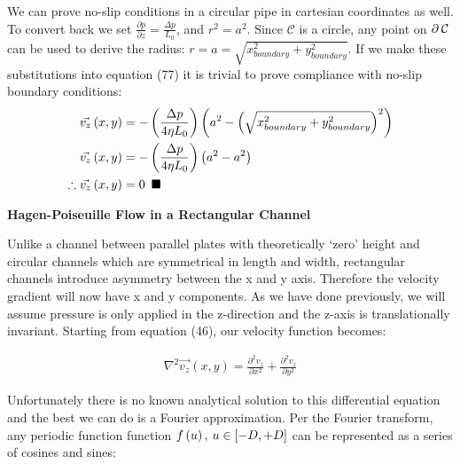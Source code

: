 \documentclass[titlepage]{article}
\begin{document}
    \noindent We can prove no-slip conditions in a circular pipe in  cartesian coordinates as well. To convert back we set $\displaystyle\frac{\partial{p}}{\partial{z}}=\displaystyle\frac{\Delta{p}}{L_{0}}$, and $r^2=a^2$. Since $\mathcal{C}$ is a circle, any point on $\partial\hspace*{2pt}\mathcal{C}$ can be used to derive the radius: 
    $r=a=\sqrt{x_{boundary}^2+y_{boundary}^2}$. If we make these substitutions into equation (77) it is trivial to prove compliance with no-slip boundary conditions:
    \begin{align}
        \vec{v_{z}}\left(x,y\right) &= -\left(\displaystyle\frac{\Delta{p}}{4\eta{L_{0}}}\right)\left(a^2-\left(\sqrt{x_{boundary}^2+y_{boundary}^2}\right)^2\right) \\
        \vec{v_{z}}\left(x,y\right) &= -\left(\displaystyle\frac{\Delta{p}}{4\eta{L_{0}}}\right)\left(a^2-a^2\right) \\
        \therefore \vec{v_{z}}\left(x,y\right) &= 0 \hspace*{5pt}\blacksquare
    \end{align}

    \newpage
    \begin{center}
        \large
        \textbf{Hagen-Poiseuille Flow in a Rectangular Channel} \\
    \end{center}
    \noindent Unlike a channel between parallel plates with theoretically `zero' height and circular channels which are symmetrical in length and width, rectangular channels introduce asymmetry between the x and y axis. Therefore the velocity gradient will now have x and y components. As we have done previously, we will assume pressure is only applied in the z-direction and the z-axis is translationally invariant. Starting from equation (46), our velocity function becomes: 

    \begin{align}
        \nabla^2\vec{v_{z}}\left(x,y\right) = \displaystyle\frac{\partial^2{v_{z}}}{\partial{x^2}}+\displaystyle\frac{\partial^2{v_{z}}}{\partial{y^2}}
    \end{align}

    \noindent Unfortunately there is no known analytical solution to this differential equation and the best we can do is a Fourier approximation. Per the Fourier transform, any periodic function function $f\left(u\right), \hspace*{2pt} u \in \left[-D, +D\right]$ can be represented as a series of cosines and sines:
\end{document}
